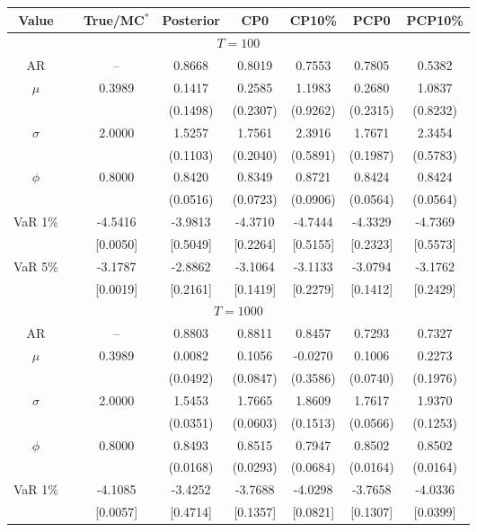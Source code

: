 { \renewcommand{\arraystretch}{1.2} 
\begin{table} 
\center 
\begin{tabular}{cc cccccc} 
Value & & True/MC$^*$ & Posterior & CP0  & CP10\% & PCP0  & PCP10\% \\ \hline 
\hline 
\multicolumn{8}{c}{$T =100$}  \\ 
\hline 
AR && -- & 0.8668 & 0.8019 & 0.7553 & 0.7805 & 0.5382 \\  
$\mu$&& 0.3989 & 0.1417 & 0.2585 & 1.1983 & 0.2680 & 1.0837 \\ 
&&   & (0.1498) & (0.2307) & (0.9262) & (0.2315) & (0.8232) \\ 
$\sigma$&& 2.0000 & 1.5257 & 1.7561 & 2.3916 & 1.7671 & 2.3454 \\ 
&&   & (0.1103) & (0.2040) & (0.5891) & (0.1987) & (0.5783) \\ 
$\phi$&& 0.8000 & 0.8420 & 0.8349 & 0.8721 & 0.8424 & 0.8424 \\ 
&&   & (0.0516) & (0.0723) & (0.0906) & (0.0564) & (0.0564) \\ 
VaR 1\% && -4.5416 & -3.9813 & -4.3710 & -4.7444 & -4.3329 & -4.7369 \\ 
  && [0.0050] & [0.5049] & [0.2264] & [0.5155] & [0.2323] & [0.5573] \\ 
VaR 5\% && -3.1787 & -2.8862 & -3.1064 & -3.1133 & -3.0794 & -3.1762 \\ 
 && [0.0019] & [0.2161] & [0.1419] & [0.2279] & [0.1412] & [0.2429] \\ 
\hline 
\multicolumn{8}{c}{$T =1000$}  \\ 
\hline 
AR && -- & 0.8803 & 0.8811 & 0.8457 & 0.7293 & 0.7327 \\  
$\mu$&& 0.3989 & 0.0082 & 0.1056 & -0.0270 & 0.1006 & 0.2273 \\ 
&&   & (0.0492) & (0.0847) & (0.3586) & (0.0740) & (0.1976) \\ 
$\sigma$&& 2.0000 & 1.5453 & 1.7665 & 1.8609 & 1.7617 & 1.9370 \\ 
&&   & (0.0351) & (0.0603) & (0.1513) & (0.0566) & (0.1253) \\ 
$\phi$&& 0.8000 & 0.8493 & 0.8515 & 0.7947 & 0.8502 & 0.8502 \\ 
&&   & (0.0168) & (0.0293) & (0.0684) & (0.0164) & (0.0164) \\ 
VaR 1\% && -4.1085 & -3.4252 & -3.7688 & -4.0298 & -3.7658 & -4.0336 \\ 
  && [0.0057] & [0.4714] & [0.1357] & [0.0821] & [0.1307] & [0.0399] \\ 

\end{tabular}
\end{table}}
